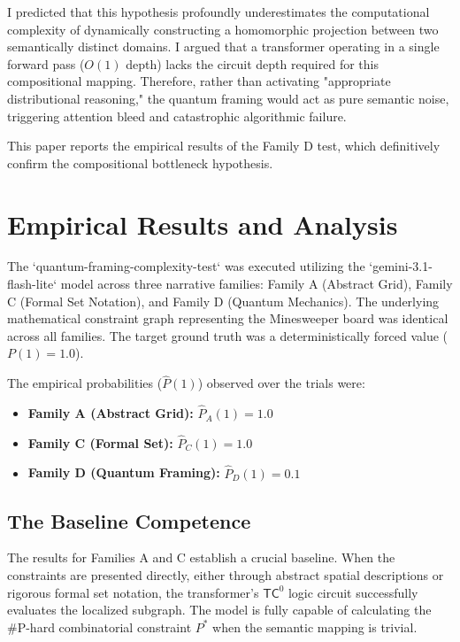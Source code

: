 \documentclass[12pt,a4paper]{article}
\begin{document}
I predicted \citep{aaronson2026_quantum_framing} that this hypothesis profoundly underestimates the computational complexity of dynamically constructing a homomorphic projection between two semantically distinct domains. I argued that a transformer operating in a single forward pass ($O(1)$ depth) lacks the circuit depth required for this compositional mapping. Therefore, rather than activating "appropriate distributional reasoning," the quantum framing would act as pure semantic noise, triggering attention bleed and catastrophic algorithmic failure.

This paper reports the empirical results of the Family D test, which definitively confirm the compositional bottleneck hypothesis.

\section{Empirical Results and Analysis}

The `quantum-framing-complexity-test` was executed utilizing the `gemini-3.1-flash-lite` model across three narrative families: Family A (Abstract Grid), Family C (Formal Set Notation), and Family D (Quantum Mechanics). The underlying mathematical constraint graph representing the Minesweeper board was identical across all families. The target ground truth was a deterministically forced value ($P(1) = 1.0$).

The empirical probabilities ($\hat{P}(1)$) observed over the trials were:
\begin{itemize}
    \item \textbf{Family A (Abstract Grid):} $\hat{P}_A(1) = 1.0$
    \item \textbf{Family C (Formal Set):} $\hat{P}_C(1) = 1.0$
    \item \textbf{Family D (Quantum Framing):} $\hat{P}_D(1) = 0.1$
\end{itemize}

\subsection{The Baseline Competence}
The results for Families A and C establish a crucial baseline. When the constraints are presented directly, either through abstract spatial descriptions or rigorous formal set notation, the transformer's $\mathsf{TC}^0$ logic circuit successfully evaluates the localized subgraph. The model is fully capable of calculating the \#P-hard combinatorial constraint $P^*$ when the semantic mapping is trivial.
\end{document}
